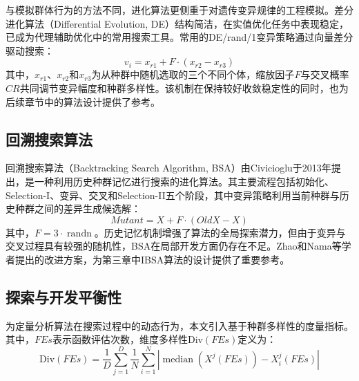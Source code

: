 与模拟群体行为的方法不同，进化算法更侧重于对遗传变异规律的工程模拟\cite{sbo_ref11}。差分进化算法（Differential Evolution, DE）\cite{ibsa_ref34}结构简洁，在实值优化任务中表现稳定，已成为代理辅助优化中的常用搜索工具。常用的DE/rand/1变异策略通过向量差分驱动搜索：
\begin{equation}
v_i = x_{r1} + F \cdot (x_{r2} - x_{r3})
\end{equation}
其中，$x_{r1}$、$x_{r2}$和$x_{r3}$为从种群中随机选取的三个不同个体，缩放因子$F$与交叉概率$CR$共同调节变异幅度和种群多样性。该机制在保持较好收敛稳定性的同时\cite{ibsa_ref55}，也为后续章节中的算法设计提供了参考。

\subsection{回溯搜索算法}

回溯搜索算法（Backtracking Search Algorithm, BSA）由Civicioglu\cite{ibsa_ref53}于2013年提出，是一种利用历史种群记忆进行搜索的进化算法。其主要流程包括初始化、Selection-I、变异、交叉和Selection-II五个阶段，其中变异策略利用当前种群与历史种群之间的差异生成候选解：
\begin{equation}
Mutant = X + F \cdot (OldX - X)
\end{equation}
其中，$F = 3 \cdot \operatorname{randn}$。历史记忆机制增强了算法的全局探索潜力，但由于变异与交叉过程具有较强的随机性，BSA在局部开发方面仍存在不足\cite{ibsa_ref63}。Zhao\cite{ibsa_ref57}和Nama\cite{ibsa_ref59}等学者提出的改进方案，为第三章中IBSA算法的设计提供了重要参考。

\subsection{探索与开发平衡性}
\label{sec:ch2_balance_diversity}

为定量分析算法在搜索过程中的动态行为，本文引入基于种群多样性的度量指标。其中，$FEs$表示函数评估次数，维度多样性$\text{Div}(FEs)$定义为：
\begin{equation}
\text{Div}(FEs)=\frac{1}{D}\sum^D_{j=1}{\frac{1}{N}\sum^N_{i=1}{\left|\operatorname{median}\left(X^j\left(FEs\right)\right)-X^j_i\left(FEs\right)\right|}}
\end{equation}

